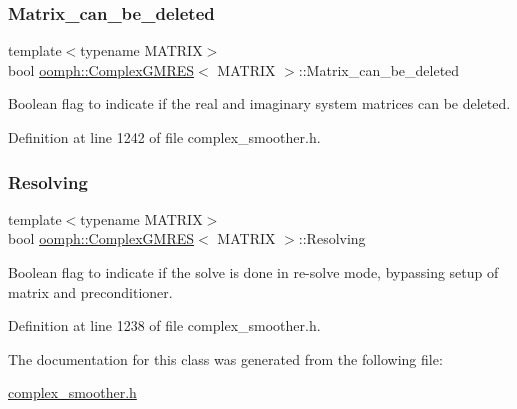 \subsubsection{\texorpdfstring{Matrix\+\_\+can\+\_\+be\+\_\+deleted}{Matrix\_can\_be\_deleted}}
{\footnotesize\ttfamily template$<$typename M\+A\+T\+R\+IX$>$ \\
bool \hyperlink{classoomph_1_1ComplexGMRES}{oomph\+::\+Complex\+G\+M\+R\+ES}$<$ M\+A\+T\+R\+IX $>$\+::Matrix\+\_\+can\+\_\+be\+\_\+deleted\hspace{0.3cm}{\ttfamily [private]}}



Boolean flag to indicate if the real and imaginary system matrices can be deleted. 



Definition at line 1242 of file complex\+\_\+smoother.\+h.

\mbox{\label{classoomph_1_1ComplexGMRES_a2694315efaf2aa353ad4d67f316b1597}} 
\subsubsection{\texorpdfstring{Resolving}{Resolving}}
{\footnotesize\ttfamily template$<$typename M\+A\+T\+R\+IX$>$ \\
bool \hyperlink{classoomph_1_1ComplexGMRES}{oomph\+::\+Complex\+G\+M\+R\+ES}$<$ M\+A\+T\+R\+IX $>$\+::Resolving\hspace{0.3cm}{\ttfamily [private]}}



Boolean flag to indicate if the solve is done in re-\/solve mode, bypassing setup of matrix and preconditioner. 



Definition at line 1238 of file complex\+\_\+smoother.\+h.



The documentation for this class was generated from the following file\+:\begin{DoxyCompactItemize}
\item 
\hyperlink{complex__smoother_8h}{complex\+\_\+smoother.\+h}\end{DoxyCompactItemize}
